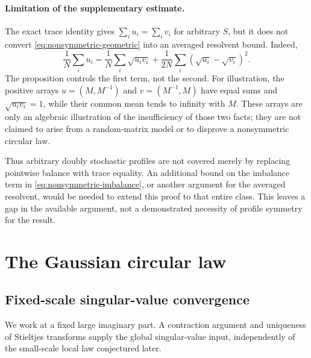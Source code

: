 \documentclass[11pt,reqno]{amsart}
\numberwithin{equation}{section}
\theoremstyle{plain}
\theoremstyle{definition}
\theoremstyle{remark}
\begin{document}
\paragraph{Limitation of the supplementary estimate.}
The exact trace identity gives $\sum_i u_i=\sum_i v_i$ for arbitrary
$S$, but it does not convert \eqref{eq:nonsymmetric-geometric} into
an averaged resolvent bound.  Indeed,
\begin{equation}\label{eq:nonsymmetric-imbalance}
 \frac1N\sum_i u_i
 =\frac1N\sum_i\sqrt{u_iv_i}
  +\frac1{2N}\sum_i(\sqrt{u_i}-\sqrt{v_i})^2.
\end{equation}
The proposition controls the first term, not the second.
For illustration, the positive arrays
$u=(M,M^{-1})$ and $v=(M^{-1},M)$ have equal sums and
$\sqrt{u_iv_i}=1$, while their common mean tends to infinity with $M$.
These arrays are only an algebraic illustration of the insufficiency of
those two facts; they are not claimed to arise from a random-matrix model
or to disprove a nonsymmetric circular law.

Thus arbitrary doubly stochastic profiles are not covered merely by
replacing pointwise balance with trace equality.  An additional bound on
the imbalance term in \eqref{eq:nonsymmetric-imbalance}, or another
argument for the averaged resolvent, would be needed to extend this
proof to that entire class.  This leaves a gap in the available argument,
not a demonstrated necessity of profile symmetry for the result.


\section{The Gaussian circular law}\label{sec:circular-proof}
\subsection{Fixed-scale singular-value convergence}\label{subsec:global}

We work at a fixed large imaginary part.  A contraction argument and
uniqueness of Stieltjes transforms supply the global singular-value input,
independently of the small-scale local law conjectured later.
\end{document}

